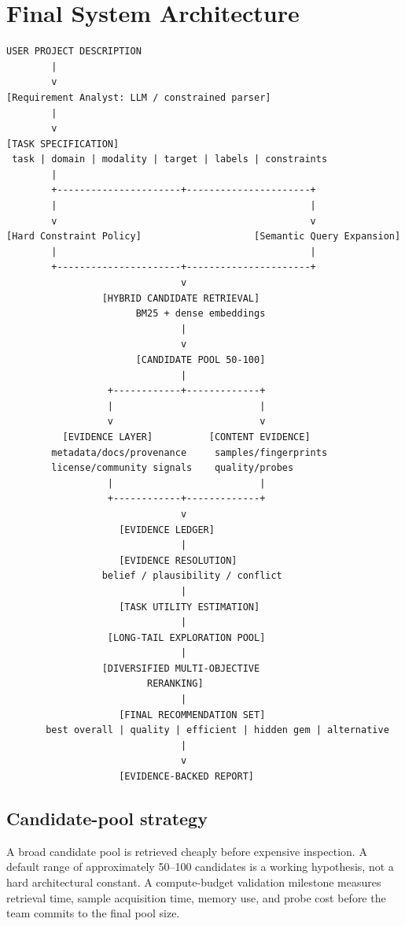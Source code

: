 \documentclass[11pt]{article}
\begin{document}
\section{Final System Architecture}
\begin{lstlisting}[basicstyle=\ttfamily\footnotesize]
USER PROJECT DESCRIPTION
        |
        v
[Requirement Analyst: LLM / constrained parser]
        |
        v
[TASK SPECIFICATION]
 task | domain | modality | target | labels | constraints
        |
        +----------------------+----------------------+
        |                                             |
        v                                             v
[Hard Constraint Policy]                    [Semantic Query Expansion]
        |                                             |
        +----------------------+----------------------+
                               v
                 [HYBRID CANDIDATE RETRIEVAL]
                       BM25 + dense embeddings
                               |
                               v
                       [CANDIDATE POOL 50-100]
                               |
                  +------------+-------------+
                  |                          |
                  v                          v
          [EVIDENCE LAYER]          [CONTENT EVIDENCE]
        metadata/docs/provenance     samples/fingerprints
        license/community signals    quality/probes
                  |                          |
                  +------------+-------------+
                               v
                    [EVIDENCE LEDGER]
                               |
                    [EVIDENCE RESOLUTION]
                 belief / plausibility / conflict
                               |
                    [TASK UTILITY ESTIMATION]
                               |
                  [LONG-TAIL EXPLORATION POOL]
                               |
                 [DIVERSIFIED MULTI-OBJECTIVE
                         RERANKING]
                               |
                    [FINAL RECOMMENDATION SET]
       best overall | quality | efficient | hidden gem | alternative
                               |
                               v
                    [EVIDENCE-BACKED REPORT]
\end{lstlisting}

\subsection{Candidate-pool strategy}
A broad candidate pool is retrieved cheaply before expensive inspection. A default range of approximately
50--100 candidates is a working hypothesis, not a hard architectural constant. A compute-budget validation
milestone measures retrieval time, sample acquisition time, memory use, and probe cost before the team
commits to the final pool size.
\end{document}
